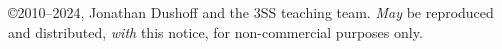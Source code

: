\copyright 2010--2024, Jonathan Dushoff and the 3SS teaching team.  \emph{May} be reproduced and distributed, \emph{with} this notice, for non-commercial purposes only.
